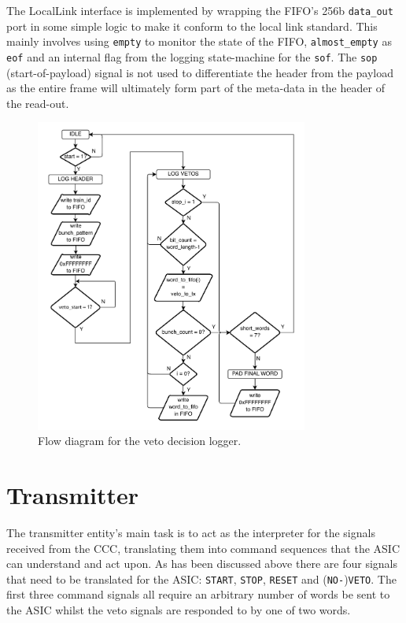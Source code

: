 The LocalLink interface is implemented by wrapping the FIFO's 256b \texttt{data\_out} port in some simple logic to make it conform to the local link standard. This mainly involves using \texttt{empty} to monitor the state of the FIFO, \texttt{almost\_empty} as \texttt{eof} and an internal flag from the logging state-machine for the \texttt{sof}. The \texttt{sop} (start-of-payload) signal is not used to differentiate the header from the payload as the entire frame will ultimately form part of the meta-data in the header of the read-out.
    
\begin{figure}[htbp]
  \centering
  \includegraphics[width=0.8\textwidth]{images/pdfs/veto_logger_flow.pdf}
  \caption{Flow diagram for the veto decision logger.}
  \label{fig:veto_logger_flow}
\end{figure}

\section{Transmitter} %
\label{sec:transmitter}
The transmitter entity's main task is to act as the interpreter for the signals received from the CCC, translating them into command sequences that the ASIC can understand and act upon. As has been discussed above there are four signals that need to be translated for the ASIC: \texttt{START}, \texttt{STOP}, \texttt{RESET} and (\texttt{NO-})\texttt{VETO}. The first three command signals all require an arbitrary number of words be sent to the ASIC whilst the veto signals are responded to by one of two words.
    
